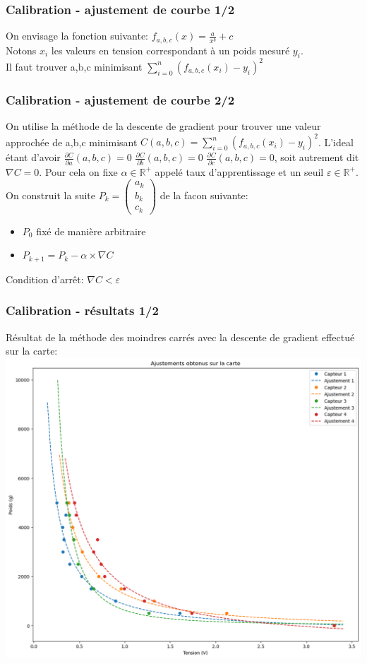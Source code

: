 \begin{frame}
\frametitle{Calibration - ajustement de courbe 1/2}
On envisage la fonction suivante: $f_{a,b,c}(x) = \frac{a}{x^b}+c$\\
Notons $x_i$ les valeurs en tension correspondant à un poids mesuré $y_i$.\\
Il faut trouver a,b,c minimisant $ \sum_{i=0}^{n} (f_{a,b,c}(x_i)-y_i)^2$
\end{frame}

\begin{frame}
\frametitle{Calibration - ajustement de courbe 2/2}
On utilise la méthode de la descente de gradient pour trouver une valeur approchée de a,b,c minimisant $C(a,b,c)=\sum_{i=0}^{n} (f_{a,b,c}(x_i)-y_i)^2$.
L'ideal étant d'avoir $\frac{\partial C}{\partial a} (a,b,c) = 0$ $\frac{\partial C}{\partial b} (a,b,c) = 0$ $\frac{\partial C}{\partial c} (a,b,c) = 0$, soit autrement dit $\nabla C = 0$. Pour cela on fixe $\alpha \in \mathbb{R}^+$ appelé taux d'apprentissage et un seuil $\varepsilon \in \mathbb{R}^+$. On construit la suite $P_k=\begin{pmatrix} a_k \\ b_k \\ c_k \end{pmatrix}$ de la facon suivante:
\begin{itemize}
\item $P_0$ fixé de manière arbitraire
\item $P_{k+1}= P_{k} - \alpha \times \nabla C$
\end{itemize}
Condition d'arrêt: $\nabla C < \varepsilon$
\end{frame}

\begin{frame}
\frametitle{Calibration - résultats 1/2}
Résultat de la méthode des moindres carrés avec la descente de gradient effectué sur la carte:\\
\includegraphics[scale=0.3]{./figures/cal_01.png}
\end{frame}

